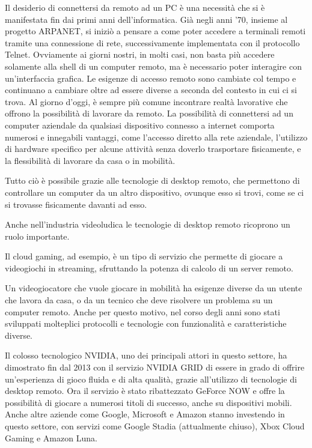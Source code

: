 \documentclass[12pt,a4paper,openright,twoside]{book}
\begin{document}
Il desiderio di connettersi da remoto ad un \ac{PC} è una necessità che si è manifestata fin dai primi anni dell'informatica.
Già negli anni '70, insieme al progetto ARPANET, si iniziò a pensare a come poter accedere a terminali remoti tramite una connessione di rete, successivamente implementata con il protocollo Telnet.
Ovviamente ai giorni nostri, in molti casi, non basta più accedere solamente alla shell di un computer remoto, ma è necessario poter interagire con un'interfaccia grafica.
%
Le esigenze di accesso remoto sono cambiate col tempo e continuano a cambiare oltre ad essere diverse a seconda del contesto in cui ci si trova.
Al giorno d'oggi, è sempre più comune incontrare realtà lavorative che offrono la possibilità di lavorare da remoto.
La possibilità di connettersi ad un computer aziendale da qualsiasi dispositivo connesso a internet comporta numerosi e innegabili vantaggi, 
come l'accesso diretto alla rete aziendale, l'utilizzo di hardware specifico per alcune attività senza doverlo trasportare fisicamente,
e la flessibilità di lavorare da casa o in mobilità.

Tutto ciò è possibile grazie alle tecnologie di desktop remoto, che permettono di controllare un computer da un altro dispositivo, ovunque esso si trovi, come se ci si trovasse fisicamente davanti ad esso.

Anche nell'industria videoludica le tecnologie di desktop remoto ricoprono un ruolo importante.

Il cloud gaming,
ad esempio, è un tipo di servizio che permette di giocare a videogiochi in streaming,
sfruttando la potenza di calcolo di un server remoto.

Un videogiocatore che vuole giocare in mobilità ha esigenze diverse da un utente che lavora da casa,
o da un tecnico che deve risolvere un problema su un computer remoto.
Anche per questo motivo, nel corso degli anni sono stati sviluppati molteplici protocolli e tecnologie con funzionalità e caratteristiche diverse.

Il colosso tecnologico NVIDIA,
uno dei principali attori in questo settore,
ha dimostrato fin dal 2013 con il servizio NVIDIA GRID di essere in grado di offrire un'esperienza di gioco fluida e di alta qualità,
grazie all'utilizzo di tecnologie di desktop remoto.
%
Ora il servizio è stato ribattezzato GeForce NOW e offre la possibilità di giocare a numerosi titoli di successo,
anche su dispositivi mobili.
%
Anche altre aziende come Google,
Microsoft e Amazon stanno investendo in questo settore,
con servizi come Google Stadia (attualmente chiuso),
Xbox Cloud Gaming e Amazon Luna.
\end{document}
